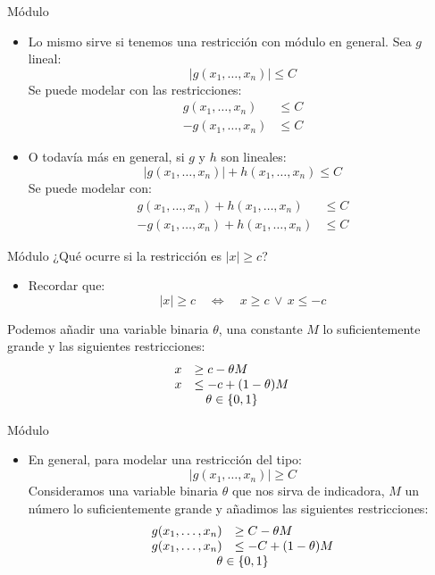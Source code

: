 \documentclass[10pt, aspectratio=169]{beamer}
\begin{document}
\begin{frame}{Módulo}
    \begin{itemize}
    \item Lo mismo sirve si tenemos una restricción con módulo en general. Sea $g$ lineal:
    $$|g(x_1,\dots,x_n)| \leq C$$
    Se puede modelar con las restricciones:
    $$\begin{array}{rl}
        g(x_1,\dots,x_n) &\leq C  \\
        -g(x_1,\dots,x_n) &\leq C
    \end{array}$$

    \item O todavía más en general, si $g$ y $h$ son lineales:
    $$|g(x_1,\dots,x_n)| + h(x_1,\dots,x_n)  \leq C$$
    Se puede modelar con:
    $$\begin{array}{rl}
        g(x_1,\dots,x_n) + h(x_1,\dots,x_n)  &\leq C  \\
        -g(x_1,\dots,x_n) + h(x_1,\dots,x_n) &\leq C
    \end{array}$$
    \end{itemize}
\end{frame}

\begin{frame}{Módulo}
    ¿Qué ocurre si la restricción es $|x| \geq c$?
    \pause
    \begin{itemize}
        \item Recordar que:
        \[ |x|\geq c \quad \Leftrightarrow \quad x\geq c \,\lor\, x\leq -c
        \]
    \end{itemize}
\end{frame}

\begin{frame}
    Podemos añadir una variable binaria $\theta$, una constante $M$ lo suficientemente grande y las siguientes
    restricciones:
        \[
        \begin{array}{rl}
            x & \geq c - \theta M  \\
            x & \leq -c + (1-\theta)M \\
            \multicolumn{2}{c}{\theta\in\{0,1\}}
        \end{array}
        \]
\end{frame}


\begin{frame}{Módulo}
    \begin{itemize}
        \item En general, para modelar una restricción del tipo:
        $$|g(x_1,\dots,x_n)| \geq C $$
        Consideramos una variable binaria $\theta$ que nos sirva de indicadora, $M$ un número lo suficientemente grande y a\~nadimos las siguientes restricciones:
        $$\begin{array}{rl}
            g(x_1,\dots,x_n) &\geq C  - \theta M  \\
            g(x_1,\dots,x_n)  &\leq -C + (1-\theta)M \\
            \multicolumn{2}{c}{\theta\in\{0,1\}}
        \end{array}
        $$
    \end{itemize}
\end{frame}
\end{document}
